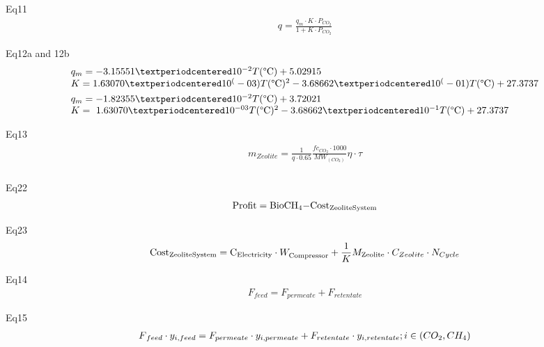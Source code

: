 \documentclass[10pt,a4paper]{article}
\begin{document}
Eq11
\begin{align}
	q = \frac{{{q_m}\cdot K\cdot{P_{C{O_2}}}}}{{1 + K\cdot{P_{C{O_2}}}}}
\end{align}

Eq12a and 12b
\begin{subequations}
\begin{align} 
	& 
	\begin{array}{l}q_m= -3.15551·10^{-2}  T(\text{\textdegree C})  + 5.02915 \\ K= 1.63070·10^(-03)  T(\text{\textdegree C})^2- 3.68662·10^(-01) T(\text{\textdegree C}) + 27.3737\end{array} 
	\\
	& \begin{array}{l} q_m=-1.82355·10^{-2}  T(\text{\textdegree C})  + 3.72021 \\ K=\ 1.63070·10^{-03}  T(\text{\textdegree C})^2- 3.68662·10^{-1}  T(\text{\textdegree C}) + 27.3737 \end{array}
\end{align}
\end{subequations}

Eq13
\begin{align}
	\begin{array}{l}{m_{Zeolite}} = \frac{1}{{q\cdot0.65}}\frac{{f{c_{C{O_2}}}\cdot1000}}{{M{W_{(C{O_2})}}}}\eta \cdot\tau \\\end{array}
\end{align}

Eq22
\begin{align}
	{\rm{Profit = BioC}}{{\rm{H}}_{\rm{4}}}{\rm{ - Cos}}{{\rm{t}}_{{\rm{Zeolite System}}}}
\end{align}

Eq23
\begin{align}
	{\rm{Cos}}{{\rm{t}}_{{\rm{Zeolite System}}}} = {{\rm{C}}_{{\rm{Electricity }}}}\cdot W_{{\rm{Compressor}}}^{} + \frac{1}{K}{M_{{\rm{Zeolite}}}}\cdot{C_{Zeolite}}\cdot{N_{Cycle}}
\end{align}

Eq14
\begin{align}
	F{}_{feed} = {F_{permeate}} + {F_{retentate}}
\end{align}

Eq15
\begin{align}
	F{}_{feed}\cdot{y_{i,feed}} = {F_{permeate}}\cdot{y_{i,permeate}} + {F_{retentate}}\cdot{y_{i,retentate}};{\rm{ }}i \in (C{O_2},{\rm{ }}C{H_4})
\end{align}
\end{document}
